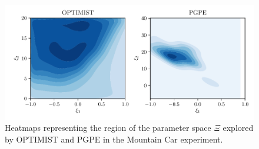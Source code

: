 \documentclass{article}
\makeatletter
\DeclareRobustCommand{\algoname}{OPTIMIST\@\xspace}
\makeatother
\begin{document}
\label{apx:expMC}
\begin{figure}[h!] 
\vskip 0.2in
    \centering
    \includegraphics[width=0.6\linewidth]{plots/heat.pdf}
    \caption{Heatmaps representing the region of the parameter space $\Xi$ explored by \algoname and PGPE in the Mountain Car experiment.} 
    \label{fig:hm} 
  \vskip -0.2in
\end{figure}


\end{document}
